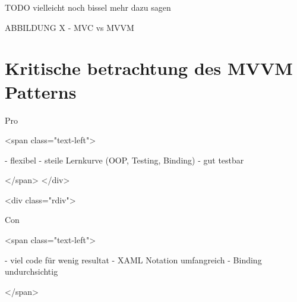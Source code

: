 \documentclass[titlepage=false,12pt]{scrreprt}
\begin{document}
TODO vielleicht noch bissel mehr dazu sagen

ABBILDUNG X - MVC vs MVVM

\chapter{Kritische betrachtung des MVVM Patterns}



Pro

<span class="text-left">

- flexibel
- steile Lernkurve (OOP, Testing, Binding)
- gut testbar

</span>
</div>

<div class="rdiv">

Con

<span class="text-left">

- viel code für wenig resultat
- XAML Notation umfangreich
- Binding undurchsichtig

</span>
\end{document}

